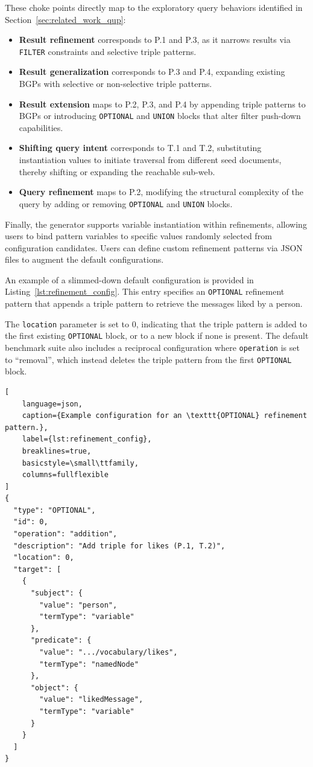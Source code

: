 These choke points directly map to the exploratory query 
behaviors identified in Section~\ref{sec:related_work_qup}:
\begin{itemize}[leftmargin=*]
    \item \textbf{Result refinement} corresponds to 
    P.1 and P.3, as it narrows results via \texttt{FILTER} 
    constraints and selective triple patterns.
    \item \textbf{Result generalization} corresponds to 
    P.3 and P.4, expanding existing BGPs with selective 
    or non-selective triple patterns.
    \item \textbf{Result extension} maps to P.2, P.3, 
    and P.4 by appending triple patterns to BGPs or 
    introducing \texttt{OPTIONAL} and \texttt{UNION} 
    blocks that alter filter push-down capabilities.
    \item \textbf{Shifting query intent} corresponds to 
    T.1 and T.2, substituting instantiation values to 
    initiate traversal from different seed documents, 
    thereby shifting or expanding the reachable sub-web.
    \item \textbf{Query refinement} maps to P.2, 
    modifying the structural complexity of the query 
    by adding or removing \texttt{OPTIONAL} and 
    \texttt{UNION} blocks.
\end{itemize}

Finally, the generator supports variable instantiation 
within refinements, allowing users to bind pattern variables 
to specific values randomly selected from configuration candidates. 
Users can define custom refinement patterns via JSON files to 
augment the default configurations. 

An example of a slimmed-down default configuration is 
provided in Listing~\ref{lst:refinement_config}. 
This entry specifies an \texttt{OPTIONAL} refinement 
pattern that appends a triple pattern to retrieve the 
messages liked by a person. 

The \texttt{location} parameter is set to 0, indicating 
that the triple pattern is added to the first existing 
\texttt{OPTIONAL} block, or to a new block if none is 
present. The default benchmark suite also includes a 
reciprocal configuration where \texttt{operation} is 
set to ``removal'', which instead deletes the triple pattern 
from the first \texttt{OPTIONAL} block.

\begin{lstlisting}[
    language=json,
    caption={Example configuration for an \texttt{OPTIONAL} refinement pattern.},
    label={lst:refinement_config},
    breaklines=true,
    basicstyle=\small\ttfamily,
    columns=fullflexible
]
{
  "type": "OPTIONAL",
  "id": 0,
  "operation": "addition",
  "description": "Add triple for likes (P.1, T.2)",
  "location": 0,
  "target": [
    {
      "subject": { 
        "value": "person", 
        "termType": "variable" 
      },
      "predicate": { 
        "value": ".../vocabulary/likes", 
        "termType": "namedNode" 
      },
      "object": { 
        "value": "likedMessage", 
        "termType": "variable" 
      }
    }
  ]
}
\end{lstlisting}

